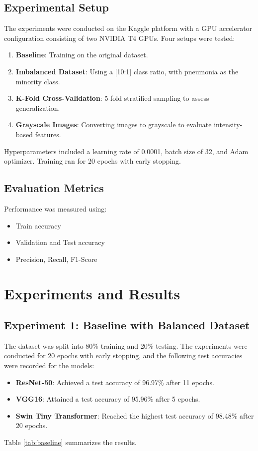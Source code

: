 \documentclass[12pt, a4paper]{article}
\begin{document}
\subsection{Experimental Setup}
The experiments were conducted on the Kaggle platform with a GPU accelerator configuration consisting of two NVIDIA T4 GPUs. Four setups were tested:
\begin{enumerate}
    \item \textbf{Baseline}: Training on the original dataset.
    \item \textbf{Imbalanced Dataset}: Using a [10:1] class ratio, with pneumonia as the minority class.
    \item \textbf{K-Fold Cross-Validation}: 5-fold stratified sampling to assess generalization.
    \item \textbf{Grayscale Images}: Converting images to grayscale to evaluate intensity-based features.
\end{enumerate}

Hyperparameters included a learning rate of 0.0001, batch size of 32, and Adam optimizer. Training ran for 20 epochs with early stopping.

\subsection{Evaluation Metrics}
Performance was measured using:
\begin{itemize}
\item Train accuracy
\item Validation and Test accuracy
\item Precision, Recall, F1-Score
\end{itemize}

\section{Experiments and Results}
\label{sec:results}

\subsection{Experiment 1: Baseline with Balanced Dataset}
The dataset was split into 80\% training and 20\% testing. The experiments were conducted for 20 epochs with early stopping, and the following test accuracies were recorded for the models:
\begin{itemize}
\item \textbf{ResNet-50}: Achieved a test accuracy of 96.97\% after 11 epochs.
\item \textbf{VGG16}: Attained a test accuracy of 95.96\% after 5 epochs.
\item \textbf{Swin Tiny Transformer}: Reached the highest test accuracy of 98.48\% after 20 epochs.
\end{itemize}
Table \ref{tab:baseline} summarizes the results.
\end{document}
